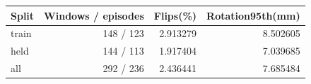 \begin{tabular}{lrrr}
\toprule
Split & Windows / episodes & Flips(\%) & Rotation95th(mm)\\
\midrule
train & 148 / 123 & 2.913279 & 8.502605\\
held & 144 / 113 & 1.917404 & 7.039685\\
all & 292 / 236 & 2.436441 & 7.685484\\
\bottomrule
\end{tabular}
